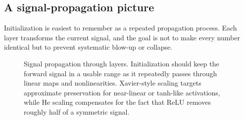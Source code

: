 \subsection*{A signal-propagation picture}

Initialization is easiest to remember as a repeated propagation process.
Each layer transforms the current signal, and the goal is not to make every number identical but to prevent systematic blow-up or collapse.

\begin{figure}[tbp]
\centering
{}
\caption{Signal propagation through layers. Initialization should keep the forward signal in a usable range as it repeatedly passes through linear maps and nonlinearities. Xavier-style scaling targets approximate preservation for near-linear or tanh-like activations, while He scaling compensates for the fact that ReLU removes roughly half of a symmetric signal.}
\end{figure}

